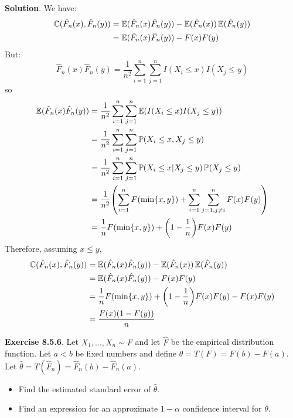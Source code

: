 \textbf{Solution}.
We have:
\begin{align*}
\operatorname{\mathbb{C}}(\hat{F}_{n}(x), \hat{F}_{n}(y)) & = \operatorname{\mathbb{E}}(\hat{F}_{n}(x) \hat{F}_{n}(y)) - \operatorname{\mathbb{E}}(\hat{F}_{n}(x))\operatorname{\mathbb{E}}(\hat{F}_{n}(y)) \\
&= \operatorname{\mathbb{E}}(\hat{F}_{n}(x) \hat{F}_{n}(y)) - F(x)F(y)
\end{align*}
But:
\[
\hat{F}_{n}(x) \hat{F}_{n}(y) = \frac{1}{n^{2}} \sum_{i=1}^{n} \sum_{j=1}^{n} I(X_{i} \leq x) I(X_{j} \leq y)
\]
so
\begin{align*}
\EXP(\hat{F}_{n}(x) \hat{F}_{n}(y)) & = \frac{1}{n^{2}} \sum_{i=1}^{n} \sum_{j=1}^{n} \EXP(I(X_{i} \leq x) I(X_{j} \leq y)) \\
&= \frac{1}{n^{2}} \sum_{i=1}^{n} \sum_{j=1}^{n} \PROB(X_{i} \leq x, X_{j} \leq y) \\
&= \frac{1}{n^{2}} \sum_{i=1}^{n} \sum_{j=1}^{n} \PROB(X_{i} \leq x | X_{j} \leq y) \PROB(X_{j} \leq y) \\
&= \frac{1}{n^{2}} \left( \sum_{i=1}^{n} F(\min\{x, y\}) + \sum_{i=1}^{n} \sum_{j=1, j \neq i}^{n} F(x)F(y) \right) \\
&= \frac{1}{n} F(\min\{x, y\}) + \left( 1 - \frac{1}{n}\right) F(x)F(y)
\end{align*}
Therefore, assuming \(x \leq y\),
\begin{align*}
\COV(\hat{F}_{n}(x), \hat{F}_{n}(y)) & = \EXP(\hat{F}_{n}(x) \hat{F}_{n}(y)) - \EXP(\hat{F}_{n}(x))\EXP(\hat{F}_{n}(y)) \\
&= \EXP(\hat{F}_{n}(x) \hat{F}_{n}(y)) - F(x)F(y) \\
&= \frac{1}{n} F(\min\{x, y\}) + \left( 1 - \frac{1}{n}\right) F(x)F(y) - F(x)F(y) \\
&= \frac{F(x)(1 - F(y))}{n}
\end{align*}

\textbf{Exercise 8.5.6}. Let \(X_{1}, \dots, X_{n} \sim F\) and let
\(\hat{F}\) be the empirical distribution function. Let \(a < b\) be
fixed numbers and define \(\theta = T(F) = F(b) - F(a)\). Let
\(\hat{\theta} = T(\hat{F}_{n}) = \hat{F}_{n}(b) - \hat{F}_{n}(a)\).
\begin{itemize}[tightlist]
\item
  Find the estimated standard error of \(\hat{\theta}\).
\item
  Find an expression for an approximate \(1 - \alpha\) confidence
  interval for \(\theta\).
\end{itemize}

